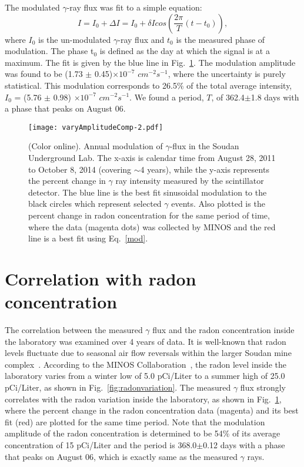 \documentclass[aps,prc,showpacs,twocolumn,superscriptaddress]{revtex4-1}
\begin{document}
The modulated $\gamma$-ray flux was fit to a simple equation:  
\begin{equation}
\label{mod}
I = I_{0} + \Delta I = I_{0} + \delta I cos(\frac{2\pi}{T}(t-t_{0})),
\end{equation}
where $I_{0}$ is the un-modulated $\gamma$-ray flux and $t_{0}$ is the measured phase of modulation. The phase t$_{0}$ is defined as the day at which the signal is at a maximum. The fit is given by the blue line in Fig.~\ref{fig:gamma_mod}. The modulation amplitude was found to be (1.73 $\pm$ 0.45)$\times$$10^{-7}$ $cm^{-2} s^{-1}$, where the uncertainty is purely statistical.  This modulation corresponds to 26.5$\%$ of the total average intensity, $I_{0}$ = (5.76 $\pm$ 0.98) $\times$$10^{-7}$ $cm^{-2} s^{-1}$.  We found a period, $T$, of 362.4$\pm$1.8 days with a phase that peaks on August 06. 
\begin{figure} [H]
\centering
\texttt{[image: varyAmplitudeComp-2.pdf]}
\caption  {(Color online). Annual modulation of $\gamma$-flux in the Soudan Underground Lab. The x-axis is calendar time from August 28, 2011 to October 8, 2014 (covering $\sim$4 years), while the y-axis represents the percent change in $\gamma$ ray intensity measured by the scintillator detector. The blue line is the best fit sinusoidal modulation to the black circles which represent selected $\gamma$ events. Also plotted is the percent change in radon concentration for the same period of time, where the data (magenta dots) was collected by MINOS and the red line is a best fit using Eq.~\ref{mod}.} 
\label{fig:gamma_mod}
\end{figure}

\section{Correlation with radon concentration}
The correlation between the measured $\gamma$ flux and the radon concentration inside the laboratory was examined over 4 years of data.  It is well-known that radon levels fluctuate due to seasonal air flow reversals within the larger Soudan mine complex~\cite{radon1}.  According to the MINOS Collaboration~\cite{minos}, the radon level inside the laboratory varies from a winter low of 5.0 pCi/Liter to a summer high of 
25.0 pCi/Liter, as shown in Fig.~\ref{fig:radonvariation}. The measured $\gamma$ flux strongly correlates with the radon variation inside the laboratory, as shown in Fig.~\ref{fig:gamma_mod}, where the percent change in the radon concentration data (magenta) and its best fit (red) are plotted for the same time period. Note that the modulation amplitude of the radon concentration is determined to be 54\% of its average concentration of 15 pCi/Liter and the period is 368.0$\pm$0.12 days with a phase that peaks on August 06, which is exactly same as the measured $\gamma$ rays.
\end{document}
